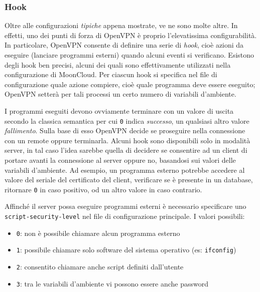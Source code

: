 \subsubsection{Hook}
Oltre alle configurazioni \textit{tipiche} appena mostrate, ve ne sono molte altre. In effetti,
uno dei punti di forza di OpenVPN è proprio l'elevatissima configurabilità.
In particolare, OpenVPN consente di definire una serie di \textit{hook},
cioè azioni da eseguire (lanciare programmi esterni) quando alcuni eventi si verificano.
Esistono degli hook ben precisi, alcuni dei quali sono effettivamente utilizzati
nella configurazione di MoonCloud. Per ciascun hook si specifica nel file di configurazione
quale azione compiere, cioè quale programma deve essere eseguito;
OpenVPN setterà per tali processi un certo numero di variabili d'ambiente.

I programmi eseguiti devono ovviamente terminare con un valore di uscita secondo
la classica semantica per cui \texttt{0} indica \textit{successo}, un qualsiasi
altro valore \textit{fallimento}. Sulla base
di esso OpenVPN decide se proseguire nella connessione con un remote oppure terminarla.
Alcuni hook sono disponibili solo in modalità server, in tal caso
l'idea sarebbe quella di decidere se consentire ad un client di portare avanti
la connessione al server oppure no, basandosi sui valori delle variabili d'ambiente.
Ad esempio, un programma esterno potrebbe accedere al valore del seriale del certificato
del client, verificare se è presente in un database, ritornare \texttt{0} in caso
positivo, od un altro valore in caso contrario.

Affinché il server possa eseguire programmi esterni è necessario specificare uno
\texttt{script-security-level} nel file di configurazione principale. I valori possibili:
\begin{itemize}
	\item \texttt{0}: non è possibile chiamare alcun programma esterno
	\item \texttt{1}: possibile chiamare solo software del sistema operativo (es: \texttt{ifconfig})
	\item \texttt{2}: consentito chiamare anche script definiti dall'utente
	\item \texttt{3}: tra le variabili d'ambiente vi possono essere anche password
\end{itemize}

